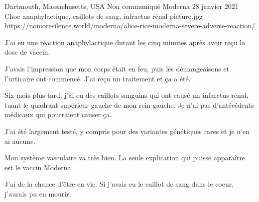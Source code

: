           {Dartmouth, Massachusetts, USA}
          {Non communiqué}
          {Moderna}
          {28 janvier 2021}
          {
            Choc anaphylactique, caillots de sang, infractus rénal
          }
          {picture.jpg}
          {https://nomoresilence.world/moderna/alice-rice-moderna-severe-adverse-reaction/}
          {

J'ai eu une réaction anaphylactique durant les cinq minutes après avoir reçu la
dose de vaccin.

J'avais l'impression que mon corps était en feu, puis les démangeaisons et
l'urticaire ont commencé. J'ai reçu un traitement et ça a été.

Six mois plus tard, j'ai eu des caillots sanguins qui ont causé un infarctus
rénal, tuant le quadrant supérieur gauche de mon rein gauche. Je n'ai pas
d'antécédents médicaux qui pourraient causer ça.

J'ai été largement testé, y compris pour des variantes génétiques rares et je
n'en ai aucune.

Mon système vasculaire va très bien. La seule explication qui puisse apparaître
est le vaccin Moderna.

J'ai de la chance d'être en vie. Si j'avais eu le caillot de sang dans le coeur,
j'aurais pu en mourir.

}
